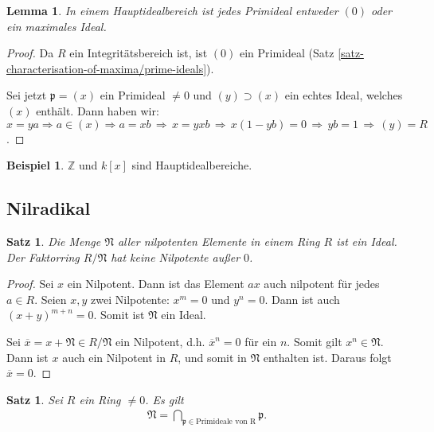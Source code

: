 \documentclass[reqno,12pt]{article}
\numberwithin{equation}{section}
\newcommand{\bZ}{\mathbb{Z}}
\newcommand{\ol}{\overline}
\theoremstyle{plain}
\newtheorem{lemma}[thm]{Lemma}
\newtheorem{proposition}[thm]{Satz}
\theoremstyle{definition}
\newtheorem{example}[thm]{Beispiel}
\begin{document}
\begin{lemma}
  In einem Hauptidealbereich ist jedes Primideal entweder $(0)$ oder ein maximales Ideal.
\end{lemma}

\begin{proof}
  Da $R$ ein Integritätsbereich ist, ist $(0)$ ein Primideal (Satz \ref{satz-characterisation-of-maxima/prime-ideals}).

  Sei jetzt $\mathfrak{p}=(x)$ ein Primideal $\neq 0$ und $(y) \supset (x)$ ein echtes Ideal, welches $(x)$ enthält. Dann haben wir: $x = ya \Rightarrow a \in (x) \Rightarrow  a = xb \, \Rightarrow \, x = yxb \, \Rightarrow \, x (1-yb) = 0 \, \Rightarrow \, yb = 1 \, \Rightarrow \, (y)=R$.
\end{proof}

\begin{example}
  $\bZ$ und $k[x]$ sind Hauptidealbereiche.
\end{example}


\subsection{Nilradikal}

\begin{proposition}
  Die Menge $\mathfrak{N}$ aller nilpotenten Elemente in einem Ring $R$ ist ein Ideal. Der Faktorring $R/\mathfrak{N}$ hat keine Nilpotente außer $0$.
\end{proposition}

\begin{proof}
  Sei $x$ ein Nilpotent. Dann ist das Element $ax$ auch nilpotent für jedes $a \in R$. Seien $x,y$ zwei Nilpotente: $x^m = 0$ und $y^n=0$. Dann ist auch $(x+y)^{m+n} = 0$. Somit ist $\mathfrak{N}$ ein Ideal.

  Sei $\ol{x}=x+\mathfrak{N} \in R/\mathfrak{N}$ ein Nilpotent, d.h. $\ol{x}^n = 0$ für ein $n$. Somit gilt $x^n \in \mathfrak{N}$. Dann ist $x$ auch ein Nilpotent in $R$, und somit in $\mathfrak{N}$ enthalten ist. Daraus folgt $\ol{x}=0$.
\end{proof}


\newpage
\begin{proposition}\label{satz-nilradical}
  Sei $R$ ein Ring $\neq 0$. Es gilt
  \begin{align*}
    \mathfrak{N} = \bigcap_{\mathfrak{p} \in \text{Primideale von R}}   \mathfrak{p}.
  \end{align*}
\end{proposition}
\end{document}
